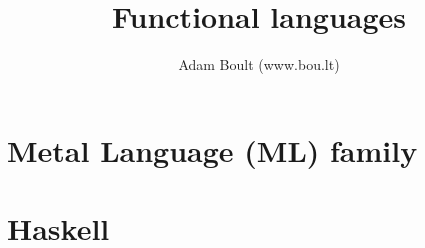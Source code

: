 \documentclass[oneside]{book}
\begin{document}
\author{Adam Boult (www.bou.lt)}
\title{Functional languages}
\maketitle

\setcounter{tocdepth}{0}
\tableofcontents



\part{Metal Language (ML) family}

\part{Haskell}
\end{document}
